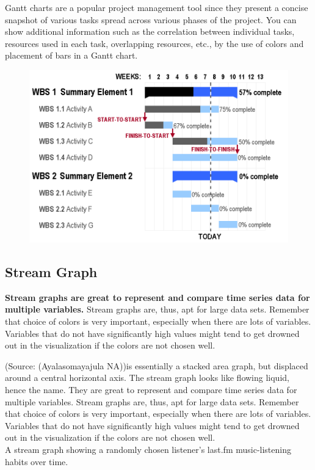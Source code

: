 \documentclass[]{book}
\theoremstyle{definition}
\theoremstyle{definition}
\theoremstyle{definition}
\theoremstyle{remark}
\begin{document}
Gantt charts are a popular project management tool since they present a
concise snapshot of various tasks spread across various phases of the
project. You can show additional information such as the correlation
between individual tasks, resources used in each task, overlapping
resources, etc., by the use of colors and placement of bars in a Gantt
chart.

\begin{figure}
\centering
\includegraphics{images/aya-gantt.png}
\caption{}
\end{figure}

\subsection{Stream Graph}\label{stream-graph}

\textbf{Stream graphs are great to represent and compare time series
data for multiple variables.} Stream graphs are, thus, apt for large
data sets. Remember that choice of colors is very important, especially
when there are lots of variables. Variables that do not have
significantly high values might tend to get drowned out in the
visualization if the colors are not chosen well.

(Source: (Ayalasomayajula NA))is essentially a stacked area graph, but
displaced around a central horizontal axis. The stream graph looks like
flowing liquid, hence the name. They are great to represent and compare
time series data for multiple variables. Stream graphs are, thus, apt
for large data sets. Remember that choice of colors is very important,
especially when there are lots of variables. Variables that do not have
significantly high values might tend to get drowned out in the
visualization if the colors are not chosen well.\\
A stream graph showing a randomly chosen listener's last.fm
music-listening habits over time.
\end{document}
